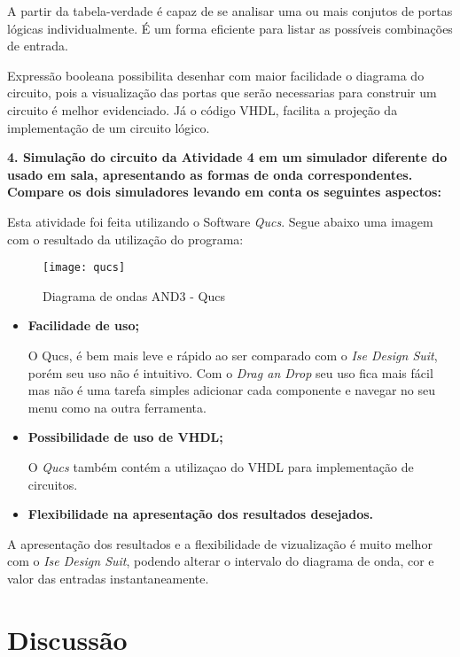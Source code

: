 \documentclass[12pts]{article}
\begin{document}
	A partir da tabela-verdade é capaz de se analisar uma ou mais conjutos de portas lógicas individualmente. É um forma eficiente para listar as possíveis combinações de entrada.

	Expressão booleana possibilita desenhar com maior facilidade o diagrama do circuito, pois a visualização das portas que serão necessarias para construir um circuito é melhor evidenciado. Já o código VHDL, facilita a projeção da implementação de um circuito lógico.

\singlespacing
\textbf{4. Simulação do circuito da Atividade 4 em um simulador diferente do usado em sala, apresentando as formas de onda correspondentes. Compare os dois simuladores levando em conta os seguintes aspectos:}
\singlespacing

	Esta atividade foi feita utilizando o Software \textit{Qucs}. Segue abaixo uma imagem com o resultado da utilização do programa:
	
\begin{figure}[!htb]
  \centering
  \texttt{[image: qucs]}
  \caption{Diagrama de ondas AND3 - Qucs}
  \label{figRotulo}
\end{figure}
	
	
\begin{itemize}
	\item \textbf{Facilidade de uso;}
	
	O Qucs, é bem mais leve e rápido ao ser comparado com o \textit{Ise Design Suit}, porém seu uso não é intuitivo. Com o \textit{Drag an Drop} seu uso fica mais fácil mas não é uma tarefa simples adicionar cada componente e navegar no seu menu como na outra ferramenta.
	
	\item \textbf{Possibilidade de uso de VHDL;}
	
	O \textit{Qucs} também contém a utilizaçao do VHDL para implementação de circuitos.
	
	\item \textbf{Flexibilidade na apresentação dos resultados desejados.}
\end{itemize}

	A apresentação dos resultados e a flexibilidade de vizualização é muito melhor com o \textit{Ise Design Suit}, podendo alterar o intervalo do diagrama de onda, cor e valor das entradas instantaneamente.


\section{Discussão}
\iffalse
Discussão sobre os resultados encontrados, comentando detalhadamente as medições realizadas e dando a devida interpretação destas, informando se os objetivos da experimento foram alcançados. Esta é uma das partes mais importantes do relatório: aqui, há oportunidade para expressar os conhecimentos adquiridos na prática e fazer a interrelação com os fundamentos teóricos.
\fi
\end{document}
